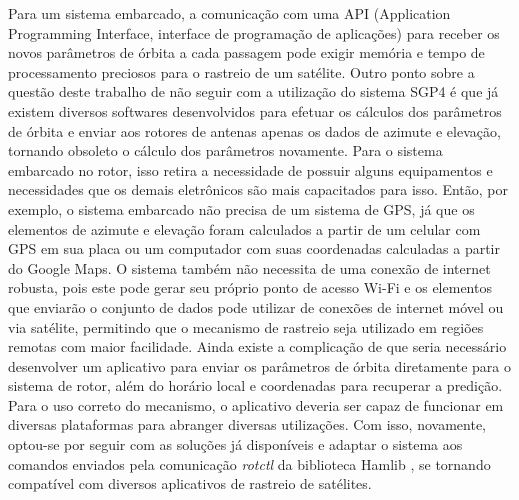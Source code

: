 Para um sistema embarcado, a comunicação com uma API (Application Programming Interface, interface de programação de aplicações) para receber os novos parâmetros de órbita a cada passagem pode exigir memória e tempo de processamento preciosos para o rastreio de um satélite.
Outro ponto sobre a questão deste trabalho de não seguir com a utilização do sistema SGP4 é que já existem diversos softwares desenvolvidos para efetuar os cálculos dos parâmetros de órbita e enviar aos rotores de antenas apenas os dados de azimute e elevação, tornando obsoleto o cálculo dos parâmetros novamente.
Para o sistema embarcado no rotor, isso retira a necessidade de possuir alguns equipamentos e necessidades que os demais eletrônicos são mais capacitados para isso. Então, por exemplo, o sistema embarcado não precisa de um sistema de GPS, já que os elementos de azimute e elevação foram calculados a partir de um celular com GPS em sua placa ou um computador com suas coordenadas calculadas a partir do Google Maps.
O sistema também não necessita de uma conexão de internet robusta, pois este pode gerar seu próprio ponto de acesso Wi-Fi e os elementos que enviarão o conjunto de dados pode utilizar de conexões de internet móvel ou via satélite, permitindo que o mecanismo de rastreio seja utilizado em regiões remotas com maior facilidade.
Ainda existe a complicação de que seria necessário desenvolver um aplicativo para enviar os parâmetros de órbita diretamente para o sistema de rotor, além do horário local e coordenadas para recuperar a predição.
Para o uso correto do mecanismo, o aplicativo deveria ser capaz de funcionar em diversas plataformas para abranger diversas utilizações.
Com isso, novamente, optou-se por seguir com as soluções já disponíveis e adaptar o sistema aos comandos enviados pela comunicação \textit{rotctl} da biblioteca Hamlib \cite{hamlib_rotctl}, se tornando compatível com diversos aplicativos de rastreio de satélites.

